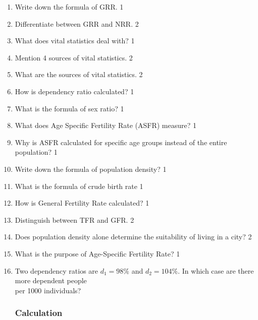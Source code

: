 \documentclass[a4paper,oneside, margin=1.4in]{book}
\begin{document}
  \begin{enumerate}
  \item Write down the formula of GRR. \hfill 1
  \item Differentiate between GRR and NRR. \hfill 2
  
  \item What does vital statistics deal with? \hfill 1
  
  \item Mention 4 sources of vital statistics. \hfill 2
  
  \item What are the sources of vital statistics. \hfill 2
  
  \item How is dependency ratio calculated? \hfill 1
  
  \item What is the formula of sex ratio? \hfill 1
  
 \item  What does Age Specific Fertility Rate (ASFR) measure? \hfill 1
 \item Why is ASFR calculated for specific age groups instead of the entire population? \hfill 1
  
  \item Write down the formula of population density? \hfill 1
  
  \item What is the formula of crude birth rate \hfill 1
  
  \item How is General Fertility Rate calculated? \hfill 1
  
  \item Distinguish between TFR and GFR. \hfill 2
  
  \item Does population density alone determine the suitability of living in a city? \hfill 2
  
  \item What is the purpose of Age-Specific Fertility Rate? \hfill 1
  
  \item Two dependency ratios are $d_1=98\%$ and $d_2=104\%$. 
  In which case are there more dependent people \\ per 1000 individuals? \hfill 
  
 \subsubsection{Calculation}
 

\end{enumerate}
\end{document}
